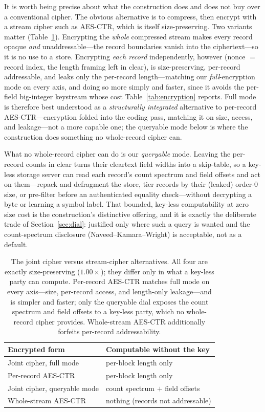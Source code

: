 \documentclass[entropy,article,submit,oneauthor,pdftex]{Definitions/mdpi}
\begin{document}
It is worth being precise about what the construction does and does not buy over a
conventional cipher. The obvious alternative is to compress, then encrypt with a stream
cipher such as AES-CTR, which is itself size-preserving. Two variants matter
(Table~\ref{tab:aesctr}). Encrypting the \emph{whole} compressed stream makes every record
opaque \emph{and} unaddressable---the record boundaries vanish into the ciphertext---so it
is no use to a store. Encrypting \emph{each record} independently, however (nonce $=$ record
index, the length framing left in clear), is size-preserving, per-record addressable, and
leaks only the per-record length---matching our \emph{full}-encryption mode on every axis,
and doing so more simply and faster, since it avoids the per-field big-integer keystream
whose cost Table~\ref{tab:encryption} reports. Full mode is therefore best understood as a
\emph{structurally integrated} alternative to per-record AES-CTR---encryption folded into
the coding pass, matching it on size, access, and leakage---not a more capable one; the
queryable mode below is where the construction does something no whole-record cipher can.

What no whole-record cipher can do is our \emph{queryable} mode. Leaving the per-record
counts in clear turns their cleartext field widths into a skip-table, so a key-less storage
server can read each record's count spectrum and field offsets and act on them---repack and
defragment the store, tier records by their (leaked) order-$0$ size, or pre-filter before an
authenticated equality check---without decrypting a byte or learning a symbol label. That
bounded, key-less computability at zero size cost is the construction's distinctive
offering, and it is exactly the deliberate trade of Section~\ref{sec:dial}: justified only
where such a query is wanted and the count-spectrum disclosure (Naveed--Kamara--Wright)
is acceptable, not as a default.

\begin{table}[ht]
\centering
\caption{The joint cipher versus stream-cipher alternatives. All four are exactly
size-preserving ($1.00\times$); they differ only in what a key-less party can compute.
Per-record AES-CTR matches full mode on every axis---size, per-record access, and
length-only leakage---and is simpler and faster; only the queryable dial exposes the count
spectrum and field offsets to a key-less party, which no whole-record cipher provides.
Whole-stream AES-CTR additionally forfeits per-record addressability.}
\renewcommand{\arraystretch}{1.15}
\begin{tabular}{l l}
\toprule
\textbf{Encrypted form} & \textbf{Computable without the key} \\
\midrule
Joint cipher, full mode       & per-block length only \\
Per-record AES-CTR            & per-block length only \\
Joint cipher, queryable mode  & count spectrum $+$ field offsets \\
Whole-stream AES-CTR          & nothing (records not addressable) \\
\bottomrule
\end{tabular}
\label{tab:aesctr}
\end{table}
\end{document}
